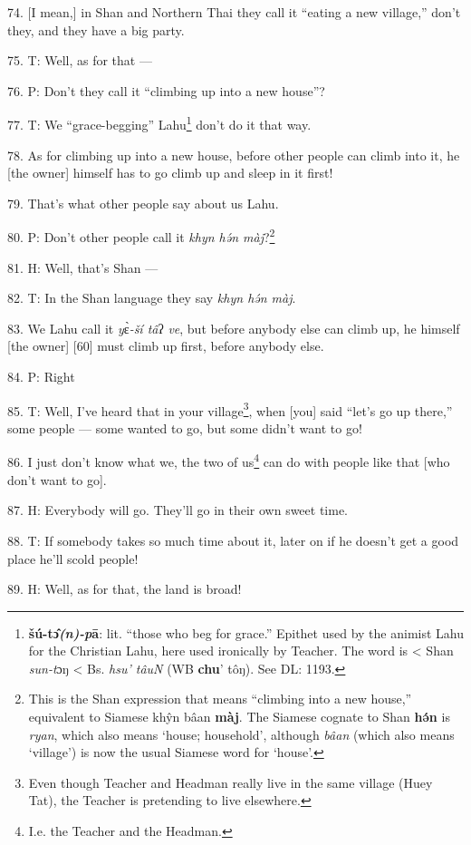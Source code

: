 74. [I mean,] in Shan and Northern Thai they call it ``eating a new village,''
don't they, and they have a big party.

75. T: Well, as for that ---

76. P: Don't they call it ``climbing up into a new house''?

77. T: We ``grace-begging'' Lahu\footnote{\textbf{šú-tɔ̂\textit{(n)-p}ā}: lit. ``those who beg for grace.'' Epithet used by the animist Lahu for the Christian Lahu, here used ironically by Teacher. The word is < Shan \textit{sun-t}ɔŋ < Bs. \textit{hsu' tâuN} (WB \textbf{chu}' tôŋ). See DL: 1193.} don't do it that way.

78. As for climbing up into a new house, before other people can climb into it,
he [the owner] himself has to go climb up and sleep in it first!

79. That's what other people say about us Lahu.

80. P: Don't other people call it \textit{khyn hə́n màj}?\footnote{This is the Shan expression that means ``climbing into a new house,'' equivalent to Siamese khŷn bâan \textbf{màj}. The Siamese cognate to Shan \textbf{hə́n} is \textit{ryan}, which also means `house; household', although \textit{bâan} (which also means `village') is now the usual Siamese word for `house'.}

81. H: Well, that's Shan ---

82. T: In the Shan language they say \textit{khyn hə́n màj}.

83. We Lahu call it \textit{y}ɛ̀\textit{-ší tâ}ʔ\textit{ ve}, but before
anybody else can climb up, he himself [the owner] [60] must climb up first, before
anybody else.

84. P: Right

85. T: Well, I've heard that in your village\footnote{Even though Teacher and Headman really live in the same village (Huey Tat), the Teacher is pretending to live elsewhere.}, when [you] said ``let's go up
there,'' some people --- some wanted to go, but some didn't want to go!

86. I just don't know what we, the two of us\footnote{I.e. the Teacher and the Headman.} can do with people like that
[who don't want to go].

87. H: Everybody will go. They'll go in their own sweet time.

88. T: If somebody takes so much time about it, later on if he doesn't get a good
place he'll scold people!

89. H: Well, as for that, the land is broad!

